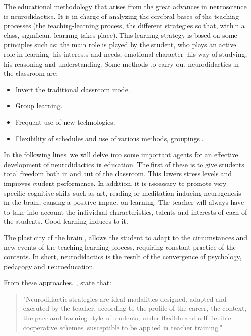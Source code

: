 \documentclass[english]{textolivre}
\begin{document}
The educational methodology that arises from the great advances in neuroscience is neurodidactics. It is in charge of analyzing the cerebral bases of the teaching processes (the teaching-learning process, the different strategies so that, within a class, significant learning takes place). This learning strategy is based on some principles such as: the main role is played by the student, who plays an active role in learning, his interests and needs, emotional character, his way of studying, his reasoning and understanding.
Some methods to carry out neurodidactics in the classroom are:

\begin{itemize}
    \item Invert the traditional classroom mode.
    \item Group learning.
    \item Frequent use of new technologies.
    \item Flexibility of schedules and use of various methods, groupings \cite{muchiut_neurodidactica_2018}.
\end{itemize}

In the following lines, we will delve into some important agents for an effective development of neurodidactics in education. The first of these is to give students total freedom both in and out of the classroom. This lowers stress levels and improves student performance. In addition, it is necessary to promote very specific cognitive skills such as art, reading or meditation inducing neurogenesis in the brain, causing a positive impact on learning.  The teacher will always have to take into account the individual characteristics, talents and interests of each of the students. Good learning induces to it.

The plasticity of the brain \cite{rebolledo_plasticidad_2003,aguilar_plasticidad_2003}, allows the student to adapt to the circumstances and new events of the teaching-learning process, requiring constant practice of the contents. In short, neurodidactics is the result of the convergence of psychology, pedagogy and neuroeducation.

From these approaches, \textcite{machicado_mamani_neurodidactica_2015}, state that: 

\begin{quote}
"Neurodidactic strategies are ideal modalities designed, adapted and executed by the teacher, according to the profile of the career, the context, the pace and learning style of students, under flexible and self-flexible cooperative schemes, susceptible to be applied in teacher training." \cite[p.~51]{machicado_mamani_neurodidactica_2015} 
\end{quote}
\end{document}
